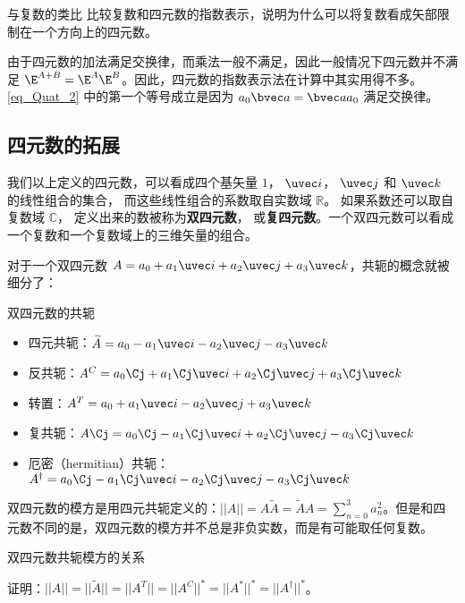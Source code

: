 \begin{exercise}{与复数的类比}
比较复数和四元数的指数表示，说明为什么可以将复数看成矢部限制在一个方向上的四元数。
\end{exercise}

由于四元数的加法满足交换律，而乘法一般不满足，因此一般情况下四元数并不满足 $\E^{A+B} = \E^A \E^B$。因此，四元数的指数表示法在计算中其实用得不多。 \autoref{eq_Quat_2} 中的第一个等号成立是因为 $a_0\bvec a = \bvec a a_0$ 满足交换律。

\subsection{四元数的拓展}

我们以上定义的四元数，可以看成四个基矢量 $1$， $\uvec i$， $\uvec j$ 和 $\uvec k$ 的线性组合的集合， 而这些线性组合的系数取自实数域 $\mathbb R$。 如果系数还可以取自复数域 $\mathbb C$， 定义出来的数被称为\textbf{双四元数}， 或\textbf{复四元数}。一个双四元数可以看成一个复数和一个复数域上的三维矢量的组合。

对于一个双四元数 $A=a_0+a_1 \uvec i+a_2\uvec j+a_3\uvec k$，共轭的概念就被细分了：

\begin{definition}{双四元数的共轭}
\begin{itemize}
\item 四元共轭：$\widetilde{A}=a_0-a_1\uvec i-a_2\uvec j-a_3\uvec k$
\item 反共轭：$A^C=a_0\Cj + a_1\Cj\uvec i+a_2\Cj\uvec j+a_3\Cj\uvec k$
\item 转置：$A^T=a_0+a_1\uvec i-a_2\uvec j+a_3\uvec k$
\item 复共轭：$A\Cj=a_0\Cj-a_1\Cj\uvec i+a_2\Cj\uvec j-a_3\Cj\uvec k$
\item 厄密（hermitian）共轭：$A^\dagger=a_0\Cj-a_1\Cj\uvec i-a_2\Cj\uvec j-a_3\Cj\uvec k$
\end{itemize}
\end{definition}

双四元数的模方是用四元共轭定义的：$||A||=A\widetilde{A}=\widetilde{A}A=\sum^{3}_{n=0}a^2_n$。但是和四元数不同的是，双四元数的模方并不总是非负实数，而是有可能取任何复数。

\begin{exercise}{双四元数共轭模方的关系}

证明：$||A||=||\widetilde{A}||=||A^T||=||A^C||^*=||A^*||^*=||A^\dagger||^*$。

\end{exercise}

